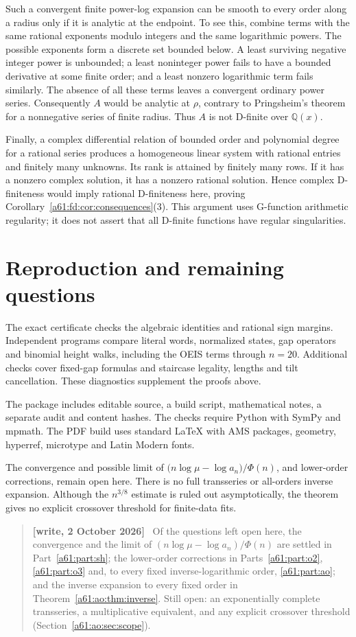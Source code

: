 \documentclass[11pt,letterpaper]{article}
\numberwithin{equation}{section}
\theoremstyle{remark}\newtheorem{remark}[theorem]{Remark}
\newcommand{\Q}{\mathbb Q}
\newenvironment{writenote}{\par\smallskip\begin{quote}\small\textbf{[write, 2 October 2026]}\ }{\end{quote}\smallskip}
\begin{document}
Such a convergent finite power-log expansion can be smooth to every order along a radius only if it is analytic at the endpoint. To see this, combine terms with the same rational exponents modulo integers and the same logarithmic powers. The possible exponents form a discrete set bounded below. A least surviving negative integer power is unbounded; a least noninteger power fails to have a bounded derivative at some finite order; and a least nonzero logarithmic term fails similarly. The absence of all these terms leaves a convergent ordinary power series. Consequently $A$ would be analytic at $\rho$, contrary to Pringsheim's theorem for a nonnegative series of finite radius. Thus $A$ is not D-finite over $\Q(x)$.

Finally, a complex differential relation of bounded order and polynomial degree for a rational series produces a homogeneous linear system with rational entries and finitely many unknowns. Its rank is attained by finitely many rows. If it has a nonzero complex solution, it has a nonzero rational solution. Hence complex D-finiteness would imply rational D-finiteness here, proving Corollary~\ref{a61:fd:cor:consequences}(3). This argument uses G-function arithmetic regularity; it does not assert that all D-finite functions have regular singularities.

\section{Reproduction and remaining questions}\label{a61:fd:sec:closing}
The exact certificate checks the algebraic identities and rational sign margins. Independent programs compare literal words, normalized states, gap operators and binomial height walks, including the OEIS terms through $n=20$. Additional checks cover fixed-gap formulas and staircase legality, lengths and tilt cancellation. These diagnostics supplement the proofs above.

The package includes editable source, a build script, mathematical notes, a separate audit and content hashes. The checks require Python with SymPy and mpmath. The PDF build uses standard LaTeX with AMS packages, geometry, hyperref, microtype and Latin Modern fonts.

The convergence and possible limit of $\bigl(n\log\mu-\log a_n\bigr)/\Phi(n)$, and lower-order corrections, remain open here. There is no full transseries or all-orders inverse expansion. Although the $n^{3/8}$ estimate is ruled out asymptotically, the theorem gives no explicit crossover threshold for finite-data fits.
\begin{writenote}
Of the questions left open here, the convergence and the limit of $(n\log\mu-\log a_n)/\Phi(n)$ are settled in Part~\ref{a61:part:sh}; the lower-order corrections in Parts~\ref{a61:part:o2}, \ref{a61:part:o3} and, to every fixed inverse-logarithmic order, \ref{a61:part:ao}; and the inverse expansion to every fixed order in Theorem~\ref{a61:ao:thm:inverse}. Still open: an exponentially complete transseries, a multiplicative equivalent, and any explicit crossover threshold (Section~\ref{a61:ao:sec:scope}).
\end{writenote}
\end{document}
